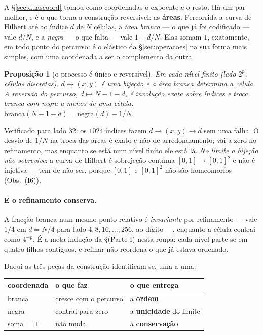 \documentclass[11pt,a4paper]{article}
\theoremstyle{plain}
\newtheorem{proposicao}[teorema]{Proposição}
\theoremstyle{definition}
\theoremstyle{remark}
\begin{document}
A \S\ref{sec:duascoord} tomou como coordenadas o expoente e o resto. Há um par melhor, e é o que
torna a construção reversível: as \textbf{áreas}. Percorrida a curva de Hilbert até ao índice $d$
de $N$ células, a área \emph{branca} --- o que já foi codificado --- vale $d/N$, e a \emph{negra}
--- o que falta --- vale $1-d/N$. Elas somam $1$, exatamente, em todo ponto do percurso: é o
elástico da \S\ref{sec:operacoes} na sua forma mais simples, com uma coordenada a ser o complemento
da outra.

\begin{proposicao}[o processo é único e reversível]\label{prop:areas}
Em cada nível finito (lado $2^p$, células discretas), $d \mapsto (x,y)$ é uma bijeção e a área
branca determina a célula. A reversão do percurso, $d\mapsto N-1-d$, é involução exata sobre
índices e troca branca com negra \emph{a menos de uma célula}: $\text{branca}(N-1-d) =
\text{negra}(d) - 1/N$.
\end{proposicao}

\noindent Verificado para lado $32$: os $1024$ índices fazem $d\to(x,y)\to d$ sem uma falha. O
desvio de $1/N$ na troca das áreas é exato e não de arredondamento; vai a zero no refinamento, mas
enquanto se está num nível finito ele está lá. \emph{No limite a bijeção não sobrevive}: a curva de
Hilbert é sobrejeção contínua $[0,1]\to[0,1]^2$ e não é injetiva --- tem de não ser, porque $[0,1]$
e $[0,1]^2$ não são homeomorfos (Obs.~(I6)).

\paragraph{E o refinamento conserva.} A fracção branca num mesmo ponto relativo é \emph{invariante}
por refinamento --- vale $1/4$ em $d=N/4$ para lado $4,8,16,\dots,256$, ao dígito ---, enquanto a
célula contrai como $4^{-p}$. É a meta-indução da \S(Parte I) nesta roupa: cada nível parte-se
em quatro filhos contíguos, e refinar não reordena o que já estava ordenado.

Daqui as três peças da construção identificam-se, uma a uma:

\begin{center}\small
\begin{tabular}{lll}
\hline
coordenada & o que faz & o que entrega \\ \hline
branca & cresce com o percurso & a \textbf{ordem} \\
negra & contrai para zero & a \textbf{unicidade} do limite \\
soma $=1$ & não muda & a \textbf{conservação} \\
\hline
\end{tabular}
\end{center}
\end{document}
